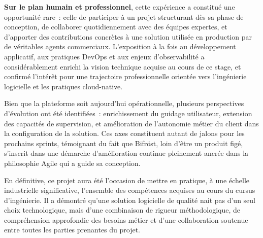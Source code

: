 \vspace{0.2cm}

\textbf{Sur le plan humain et professionnel}, cette exp\'erience a constitu\'e une opportunit\'e rare~: celle de participer \`a un projet structurant d\`es sa phase de conception, de collaborer quotidiennement avec des \'equipes expertes, et d'apporter des contributions concr\`etes \`a une solution utilis\'ee en production par de v\'eritables agents commerciaux. L'exposition \`a la fois au d\'eveloppement applicatif, aux pratiques DevOps et aux enjeux d'observabilit\'e a consid\'erablement enrichi la vision technique acquise au cours de ce stage, et confirm\'e l'int\'er\^et pour une trajectoire professionnelle orient\'ee vers l'ing\'enierie logicielle et les pratiques cloud-native.

\vspace{0.2cm}

Bien que la plateforme soit aujourd'hui op\'erationnelle, plusieurs perspectives d'\'evolution ont \'et\'e identifi\'ees~: enrichissement du guidage utilisateur, extension des capacit\'es de supervision, et am\'elioration de l'autonomie m\'etier du client dans la configuration de la solution. Ces axes constituent autant de jalons pour les prochains sprints, t\'emoignant du fait que Bifr\"ost, loin d'\^etre un produit fig\'e, s'inscrit dans une d\'emarche d'am\'elioration continue pleinement ancrée dans la philosophie Agile qui a guide sa conception.

\vspace{0.4cm}

En d\'efinitive, ce projet aura \'et\'e l'occasion de mettre en pratique, \`a une \'echelle industrielle significative, l'ensemble des comp\'etences acquises au cours du cursus d'ing\'enierie. Il a d\'emontr\'e qu'une solution logicielle de qualit\'e nait pas d'un seul choix technologique, mais d'une combinaison de rigueur m\'ethodologique, de compr\'ehension approfondie des besoins m\'etier et d'une collaboration soutenue entre toutes les parties prenantes du projet.